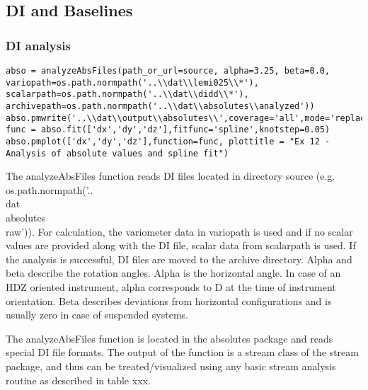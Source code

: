 \subsection{DI and Baselines}

\subsubsection{DI analysis}

\begin{verbatim}
abso = analyzeAbsFiles(path_or_url=source, alpha=3.25, beta=0.0, variopath=os.path.normpath('..\\dat\\lemi025\\*'), scalarpath=os.path.normpath('..\\dat\\didd\\*'), archivepath=os.path.normpath('..\\dat\\absolutes\\analyzed'))
abso.pmwrite('..\\dat\\output\\absolutes\\',coverage='all',mode='replace',filenamebegins='absolutes_lemi')
func = abso.fit(['dx','dy','dz'],fitfunc='spline',knotstep=0.05)
abso.pmplot(['dx','dy','dz'],function=func, plottitle = "Ex 12 - Analysis of absolute values and spline fit")
\end{verbatim}
The analyzeAbsFiles function reads DI files located in directory source (e.g. os.path.normpath('..\\dat\\absolutes\\raw')). For calculation, the variometer data in variopath is used and if no scalar values are provided along with the DI file, scalar data from scalarpath is used. If the analysis is successful, DI files are moved to the archive directory. Alpha and beta describe the rotation angles. Alpha is the horizontal angle. In case of an HDZ oriented instrument, alpha corresponds to D at the time of instrument orientation. Beta describes deviations from horizontal configurations and is usually zero in case of suspended systems.

The analyzeAbsFiles function is located in the absolutes package and reads special DI file formats. The output of the function is a stream class of the stream package, and thus can be treated/visualized using any basic stream analysis routine as described in table xxx. 

